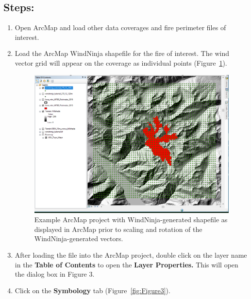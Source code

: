 \documentclass[12pt]{article}
\begin{document}
\subsection*{Steps:}
\begin{enumerate}
\item Open ArcMap and load other data coverages and fire perimeter files of interest.
\item Load the ArcMap WindNinja shapefile for the fire of interest. The wind vector grid will appear on the
coverage as individual points (Figure~\ref{fig:Figure2}).

\begin{figure}[H]
	\centering
	\includegraphics[scale=0.4]{arc_2.png}
	\caption{Example ArcMap project with WindNinja-generated shapefile as displayed in ArcMap prior to scaling and rotation of the
WindNinja-generated vectors.}
\label{fig:Figure2}

\end{figure}

\item After loading the file into the ArcMap project, double click on the layer name in the \textbf{Table of Contents} to
open the \textbf{Layer Properties.} This will open the dialog box in Figure 3.

\item Click on the \textbf{Symbology} tab (Figure~\ref{fig:Figure3}).


\end{enumerate}
\end{document}

